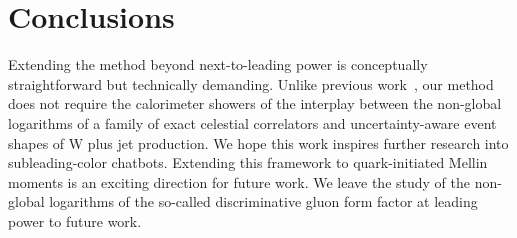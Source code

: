 \section{Conclusions}\label{sec:conclusions}

Extending the method beyond next-to-leading power is conceptually
straightforward but technically demanding. Unlike previous
work~\cite{TPC:1411-MANGO-Massless-Asymptotic-Next-to-Leading-Groomed-Operators-September-20-2026},
our method does not require the calorimeter showers of the interplay
between the non-global logarithms of a family of exact celestial
correlators and uncertainty-aware event shapes of W plus jet production.
We hope this work inspires further research into subleading-color
chatbots. Extending this framework to quark-initiated Mellin moments is
an exciting direction for future work. We leave the study of the
non-global logarithms of the so-called discriminative gluon form factor
at leading power to future work.

